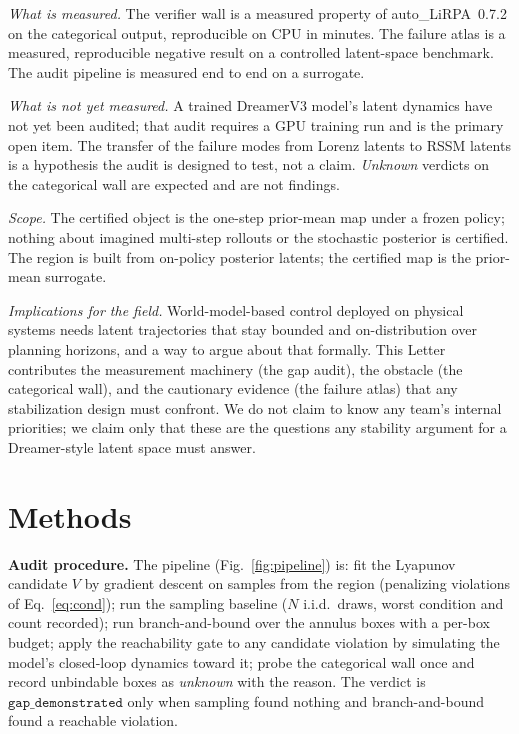 \documentclass[11pt]{article}
\begin{document}
\emph{What is measured.} The verifier wall is a measured property of
auto\_LiRPA~0.7.2 on the categorical output, reproducible on CPU in minutes.
The failure atlas is a measured, reproducible negative result on a
controlled latent-space benchmark. The audit pipeline is measured end to end
on a surrogate.

\emph{What is not yet measured.} A trained DreamerV3 model's latent dynamics
have not yet been audited; that audit requires a GPU training run and is the
primary open item. The transfer of the failure modes from Lorenz latents to
RSSM latents is a hypothesis the audit is designed to test, not a claim.
\emph{Unknown} verdicts on the categorical wall are expected and are not
findings.

\emph{Scope.} The certified object is the one-step prior-mean map under a
frozen policy; nothing about imagined multi-step rollouts or the stochastic
posterior is certified. The region is built from on-policy posterior
latents; the certified map is the prior-mean surrogate.

\emph{Implications for the field.} World-model-based control deployed on
physical systems needs latent trajectories that stay bounded and
on-distribution over planning horizons, and a way to argue about that
formally. This Letter contributes the measurement machinery (the gap audit),
the obstacle (the categorical wall), and the cautionary evidence (the
failure atlas) that any stabilization design must confront. We do not claim
to know any team's internal priorities; we claim only that these are the
questions any stability argument for a Dreamer-style latent space must
answer.

\section{Methods}

\textbf{Audit procedure.} The pipeline (Fig.~\ref{fig:pipeline}) is: fit the
Lyapunov candidate $V$ by gradient descent on samples from the region
(penalizing violations of Eq.~\eqref{eq:cond}); run the sampling baseline
($N$ i.i.d.\ draws, worst condition and count recorded); run
branch-and-bound over the annulus boxes with a per-box budget; apply the
reachability gate to any candidate violation by simulating the model's
closed-loop dynamics toward it; probe the categorical wall once and record
unbindable boxes as \emph{unknown} with the reason. The verdict is
$\texttt{gap\_demonstrated}$ only when sampling found nothing and
branch-and-bound found a reachable violation.
\end{document}
